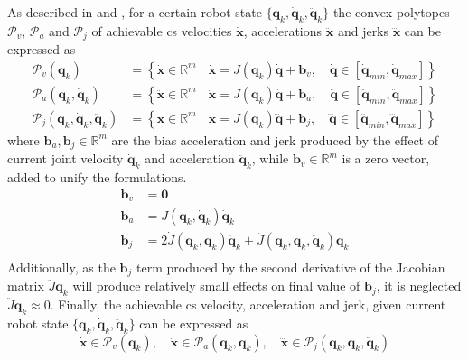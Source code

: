 As described in  and , for a certain robot state $\{\bm{q}_k,\dot{\bm{q}}_k,\ddot{\bm{q}}_k\}$ the convex polytopes $\mathcal{P}_v$, $\mathcal{P}_a$ and $\mathcal{P}_j$ of achievable \gls{cs} velocities $\dot{\bm{x}}$, accelerations $\ddot{\bm{x}}$ and jerks $\dddot{\bm{x}}$ can be expressed as
\begin{subequations}
\begin{align}
    \mathcal{P}_v(\bm{q}_k) &= \left\{ \dot{\bm{x}}\in\mathbb{R}^m ~|~~ \dot{\bm{x}}=J(\bm{q}_k)\dot{\bm{q}} + \bm{b}_v, \quad \dot{\bm{q}}\in \left[\dot{\bm{q}}_{min}, \dot{\bm{q}}_{max} \right] \right\}\label{eq:topca_vel_poly}\\
    \mathcal{P}_a(\bm{q}_k,\dot{\bm{q}}_k)  &= \left\{ \ddot{\bm{x}}\in\mathbb{R}^m ~|~~ \ddot{\bm{x}}=J(\bm{q}_k)\ddot{\bm{q}} + \bm{b}_a, \quad \ddot{\bm{q}}\in \left[\ddot{\bm{q}}_{min}, \ddot{\bm{q}}_{max} \right] \right\}\label{eq:topca_accel_poly}\\
    \mathcal{P}_j(\bm{q}_k,\dot{\bm{q}}_k,\ddot{\bm{q}}_k) &= \left\{ \dddot{\bm{x}}\in\mathbb{R}^m ~|~~ \dddot{\bm{x}}=J(\bm{q}_k)\dddot{\bm{q}} +\bm{b}_j, \quad \dddot{\bm{q}}\in \left[\dddot{\bm{q}}_{min}, \dddot{\bm{q}}_{max} \right] \right\}\label{eq:topca_jerk_poly}
\end{align}\label{eq:topca_polys}
\end{subequations}
where $\bm{b}_a,\bm{b}_j\in\mathbb{R}^m$ are the bias acceleration and jerk produced by the effect of current joint velocity $\dot{\bm{q}}_k$ and acceleration $\ddot{\bm{q}}_k$, while $\bm{b}_v\in\mathbb{R}^m$ is a zero vector, added to unify the formulations.
\begin{equation}
\begin{split}
\bm{b}_v&= \bm{0}\\
\bm{b}_a&= \dot{J}(\bm{q}_k,\dot{\bm{q}}_k)\dot{\bm{q}}_k\\
\bm{b}_j&= 2\dot{J}(\bm{q}_k,\dot{\bm{q}}_k)\ddot{\bm{q}}_k + \ddot{J}(\bm{q}_k,\dot{\bm{q}}_k,\ddot{\bm{q}}_k)\dot{\bm{q}}_k\\
 \end{split} \label{eq:bias_terms}
\end{equation}
Additionally, as the $\bm{b}_j$ term produced by the second derivative of the Jacobian matrix $\ddot{J}\dot{\bm{q}}_k$ will produce relatively small effects on final value of $\bm{b}_j$, it is neglected $\ddot{J}\dot{\bm{q}}_k \approx 0$. Finally, the achievable \gls{cs} velocity, acceleration and jerk, given current robot state $\{\bm{q}_k,\dot{\bm{q}}_k,\ddot{\bm{q}}_k\}$ can be expressed as
\begin{equation}
    \dot{\bm{x}}\in \mathcal{P}_v(\bm{q}_k), \quad \ddot{\bm{x}}\in \mathcal{P}_a(\bm{q}_k,\dot{\bm{q}}_k), \quad \dddot{\bm{x}}\in \mathcal{P}_j(\bm{q}_k,\dot{\bm{q}}_k,\ddot{\bm{q}}_k)\label{eq:limits_poly}
\end{equation}

